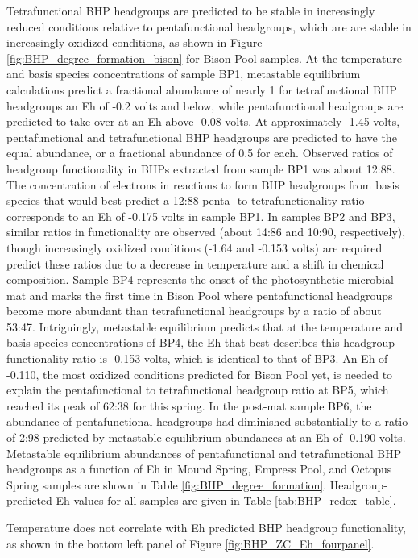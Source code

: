 Tetrafunctional BHP headgroups are predicted to be stable in increasingly reduced conditions relative to pentafunctional headgroups, which are are stable in increasingly oxidized conditions, as shown in Figure \ref{fig:BHP_degree_formation_bison} for Bison Pool samples. At the temperature and basis species concentrations of sample BP1, metastable equilibrium calculations predict a fractional abundance of nearly 1 for tetrafunctional BHP headgroups an Eh of -0.2 volts and below, while pentafunctional headgroups are predicted to take over at an Eh above -0.08 volts. At approximately -1.45 volts, pentafunctional and tetrafunctional BHP headgroups are predicted to have the equal abundance, or a fractional abundance of 0.5 for each. Observed ratios of headgroup functionality in BHPs extracted from sample BP1 was about 12:88. The concentration of electrons in reactions to form BHP headgroups from basis species that would best predict a 12:88 penta- to tetrafunctionality ratio corresponds to an Eh of -0.175 volts in sample BP1. In samples BP2 and BP3, similar ratios in functionality are observed (about 14:86 and 10:90, respectively), though increasingly oxidized conditions (-1.64 and -0.153 volts) are required predict these ratios due to a decrease in temperature and a shift in chemical composition. Sample BP4 represents the onset of the photosynthetic microbial mat and marks the first time in Bison Pool where pentafunctional headgroups become more abundant than tetrafunctional headgroups by a ratio of about 53:47. Intriguingly, metastable equilibrium predicts that at the temperature and basis species concentrations of BP4, the Eh that best describes this headgroup functionality ratio is -0.153 volts, which is identical to that of BP3. An Eh of -0.110, the most oxidized conditions predicted for Bison Pool yet, is needed to explain the pentafunctional to tetrafunctional headgroup ratio at BP5, which reached its peak of 62:38 for this spring. In the post-mat sample BP6, the abundance of pentafunctional headgroups had diminished substantially to a ratio of 2:98 predicted by metastable equilibrium abundances at an Eh of -0.190 volts. Metastable equilibrium abundances of pentafunctional and tetrafunctional BHP headgroups as a function of Eh in Mound Spring, Empress Pool, and Octopus Spring samples are shown in Table \ref{fig:BHP_degree_formation}. Headgroup-predicted Eh values for all samples are given in Table \ref{tab:BHP_redox_table}.

Temperature does not correlate with Eh predicted BHP headgroup functionality, as shown in the bottom left panel of Figure \ref{fig:BHP_ZC_Eh_fourpanel}.




